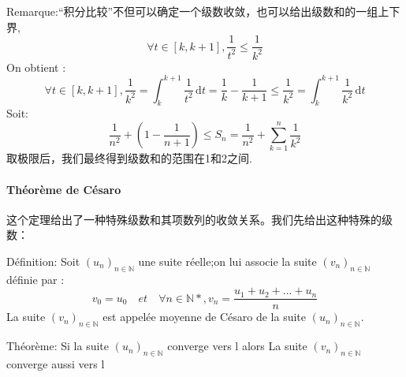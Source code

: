 \documentclass[12pt]{book}
\theoremstyle{definition}\newtheorem{dfn}{Définition}[chapter]
\theoremstyle{plain}\newtheorem{thm}{Théorème}[chapter]
\theoremstyle{plain}\newtheorem{prp}{Proposition}[chapter]
\theoremstyle{plain}\newtheorem{lem}{\bf Lemme}[chapter]
\theoremstyle{plain}\newtheorem{axm}{\bf Axiome}[chapter]
\theoremstyle{plain}\newtheorem{lmm}{\bf Lemme}[chapter]
\theoremstyle{plain}\newtheorem{exm}{\bf Example}[chapter]
\theoremstyle{plain}\newtheorem{cor}{\bf Corollaire}[chapter]
\theoremstyle{remark}\newtheorem{rem}{Remarque}[chapter]
\begin{document}
Remarque:“积分比较”不但可以确定一个级数收敛，也可以给出级数和的一组上下界,
$$
\forall t \in [k,k+1], \frac{1}{t^2} \leqslant \frac{1}{k^2}
$$
On obtient :
\begin{equation*}
\forall t \in [k,k+1],
\frac{1}{k^2} = \int_k^{k+1} \frac{1}{t^2}\,\mathrm{d}t=
\frac{1}{k}-\frac{1}{k+1}
\leqslant \frac{1}{k^2} = \int_k^{k+1} \frac{1}{k^2}\,\mathrm{d}t
\end{equation*}
Soit:
$$\frac{1}{n^{2}}+(1-\frac{1}{n+1})
\leqslant S_n=\frac{1}{n^{2}}+\sum_{k=1}^{n} {\frac{1}{k^2}}
$$
取极限后，我们最终得到级数和的范围在1和2之间.

\paragraph{Théorème de Césaro}
这个定理给出了一种特殊级数和其项数列的收敛关系。我们先给出这种特殊的级数：

Définition:  Soit $(u_n)_{n\in \mathbb{N}}$ une suite réelle;on lui associe la suite $(v_n)_{n\in \mathbb{N}}$ définie par :
$$ v_0=u_0 \quad et \quad \forall n \in \mathbb{N*}, v_n=\frac{u_1+u_2+...+u_n}{n} $$
La suite $(v_n)_{n\in \mathbb{N}}$ est appelée moyenne de Césaro de la suite $(u_n)_{n\in \mathbb{N}}$.

Théorème: Si la suite $(u_n)_{n\in \mathbb{N}}$ converge vers l alors La suite $(v_n)_{n\in \mathbb{N}}$ converge aussi vers l
\end{document}
